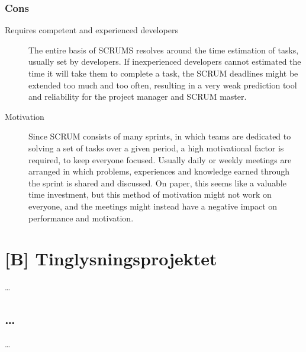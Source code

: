 \documentclass[11pt]{article}
\begin{document}
\begin{multicols}{2}
    \subsubsection{Cons}
    \begin{description}
        \item[Requires competent and experienced developers] The entire basis of SCRUMS resolves around the time estimation of tasks, usually set by developers. If inexperienced developers cannot estimated the time it will take them to complete a task, the SCRUM deadlines might be extended too much and too often, resulting in a very weak prediction tool and reliability for the project manager and SCRUM master.
        \item[Motivation] Since SCRUM consists of many sprints, in which teams are dedicated to solving a set of tasks over a given period, a high motivational factor is required, to keep everyone focused. Usually daily or weekly meetings are arranged in which problems, experiences and knowledge earned through the sprint is shared and discussed. On paper, this seems like a valuable time investment, but this method of motivation might not work on everyone, and the meetings might instead have a negative impact on performance and motivation.
    \end{description}
\end{multicols}

\clearpage
\section{[B] Tinglysningsprojektet} %
\label{sec:B}
\dots

\subsection{\dots}

\dots
\end{document}
